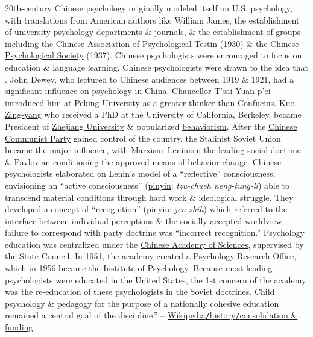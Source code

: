 \documentclass[oneside]{book}
\numberwithin{equation}{section}
\begin{document}
20th-century Chinese psychology originally modeled itself on U.S. psychology, with translations from American authors like William James, the establishment of university psychology departments \& journals, \& the establishment of groups including the Chinese Association of Psychological Testin (1930) \& the \href{https://en.wikipedia.org/wiki/Chinese_Psychological_Society}{Chinese Psychological Society} (1937). Chinese psychologists were encouraged to focus on education \& language learning. Chinese psychologists were drawn to the idea that . John Dewey, who lectured to Chinese audiences between 1919 \& 1921, had a significant influence on psychology in China. Chancellor \href{https://en.wikipedia.org/wiki/Cai_Yuanpei}{T'sai Yuan-p'ei} introduced him at \href{https://en.wikipedia.org/wiki/Peking_University}{Peking University} as a greater thinker than Confucius. \href{https://en.wikipedia.org/wiki/Zing-Yang_Kuo}{Kuo Zing-yang} who received a PhD at the University of California, Berkeley, became President of \href{https://en.wikipedia.org/wiki/Zhejiang_University}{Zhejiang University} \& popularized \href{https://en.wikipedia.org/wiki/Behaviorism}{behaviorism}. After the \href{https://en.wikipedia.org/wiki/Chinese_Communist_Party}{Chinese Communist Party} gained control of the country, the Stalinist Soviet Union became the major influence, with \href{https://en.wikipedia.org/wiki/Marxism%E2%80%93Leninism}{Marxism--Leninism} the leading social doctrine \& Pavlovian conditioning the approved means of behavior change. Chinese psychologists elaborated on Lenin's model of a ``reflective'' consciousness, envisioning an ``active consciousness'' (\href{https://en.wikipedia.org/wiki/Pinyin}{pinyin}: \textit{tzu-chueh neng-tung-li}) able to transcend material conditions through hard work \& ideological struggle. They developed a concept of ``recognition'' (pinyin: \textit{jen-shih}) which referred to the interface between individual perceptions \& the socially accepted worldview; failure to correspond with party doctrine was ``incorrect recognition.'' Psychology education was centralized under the \href{https://en.wikipedia.org/wiki/Chinese_Academy_of_Sciences}{Chinese Academy of Sciences}, supervised by the \href{https://en.wikipedia.org/wiki/State_Council_of_the_People%27s_Republic_of_China}{State Council}. In 1951, the academy created a Psychology Research Office, which in 1956 became the Institute of Psychology. Because most leading psychologists were educated in the United States, the 1st concern of the academy was the re-education of these psychologists in the Soviet doctrines. Child psychology \& pedagogy for the purpose of a nationally cohesive education remained a central goal of the discipline.'' -- \href{https://en.wikipedia.org/wiki/Psychology#Consolidation_and_funding}{Wikipedia\texttt{/}history\texttt{/}consolidation \& funding}
\end{document}
